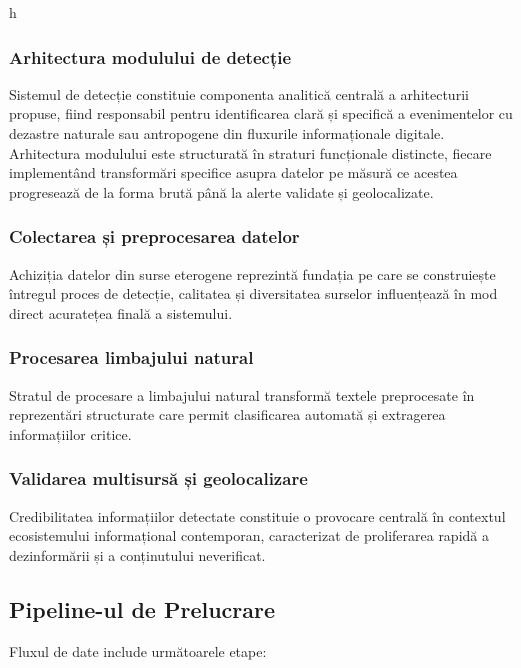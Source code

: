 h\documentclass[12pt,a4paper]{article}
\begin{document}
\subsubsection{Arhitectura modulului de detecție}
\label{subsubsec:arhitectura_modului_de_detecție}
\hspace{1em} Sistemul de detecție constituie componenta analitică centrală a arhitecturii propuse, fiind responsabil pentru identificarea clară și specifică a evenimentelor cu dezastre naturale sau antropogene din fluxurile informaționale digitale. Arhitectura modulului este structurată în straturi funcționale distincte, fiecare implementând transformări specifice asupra datelor pe măsură ce acestea progresează de la forma brută până la alerte validate și geolocalizate. 

\subsubsection{Colectarea și preprocesarea datelor}
\hspace{1em}Achiziția datelor din surse eterogene reprezintă fundația pe care se construiește întregul proces de detecție, calitatea și diversitatea surselor influențează în mod direct acuratețea finală a sistemului. 

\subsubsection{Procesarea limbajului natural}
\hspace{1em}Stratul de procesare a limbajului natural transformă textele preprocesate în reprezentări structurate care permit clasificarea automată și extragerea informațiilor critice. 

\subsubsection{Validarea multisursă și geolocalizare}
\hspace{1em}Credibilitatea informațiilor detectate constituie o provocare centrală în contextul ecosistemului informațional contemporan, caracterizat de proliferarea rapidă a dezinformării și a conținutului neverificat. 

\subsection{Pipeline-ul de Prelucrare}
\label{subsec:pipeline}

Fluxul de date include următoarele etape:
\end{document}
